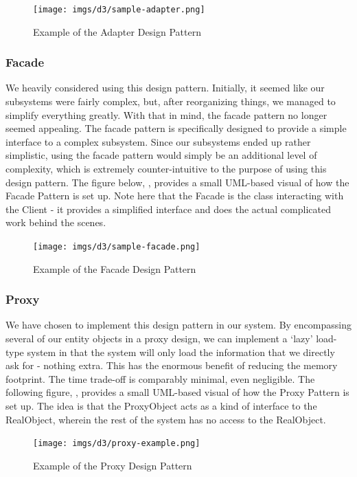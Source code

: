 \documentclass[12pt,letterpaper]{article}
\begin{document}
\begin{figure}[H]
	\centering{}
	\texttt{[image: imgs/d3/sample-adapter.png]}
	\caption{Example of the Adapter Design Pattern}
\end{figure}

\subsubsection*{Facade}
We heavily considered using this design pattern. Initially, it seemed like our subsystems were fairly complex, but, after reorganizing things, we managed to simplify everything greatly. With that in mind, the facade pattern no longer seemed appealing. The facade pattern is specifically designed to provide a simple interface to a complex subsystem. Since our subsystems ended up rather simplistic, using the facade pattern would simply be an additional level of complexity, which is extremely counter-intuitive to the purpose of using this design pattern. The figure below, , provides a small UML-based visual of how the Facade Pattern is set up. Note here that the Facade is the class interacting with the Client - it provides a simplified interface and does the actual complicated work behind the scenes.

\begin{figure}[H]
	\centering{}
	\texttt{[image: imgs/d3/sample-facade.png]}
	\caption{Example of the Facade Design Pattern}
\end{figure}

\subsubsection*{Proxy}
We have chosen to implement this design pattern in our system. By encompassing several of our entity objects in a proxy design, we can implement a `lazy' load-type system in that the system will only load the information that we directly ask for - nothing extra. This has the enormous benefit of reducing the memory footprint. The time trade-off is comparably minimal, even negligible. The following figure, , provides a small UML-based visual of how the Proxy Pattern is set up. The idea is that the ProxyObject acts as a kind of interface to the RealObject, wherein the rest of the system has no access to the RealObject.

\begin{figure}[H]
	\centering{}
	\texttt{[image: imgs/d3/proxy-example.png]}
	\caption{Example of the Proxy Design Pattern}
\end{figure}
\end{document}
